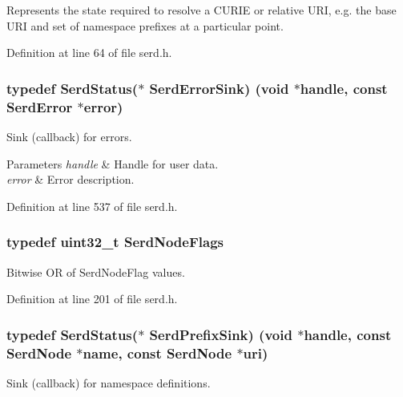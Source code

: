 Represents the state required to resolve a C\+U\+R\+IE or relative U\+RI, e.\+g. the base U\+RI and set of namespace prefixes at a particular point. 

Definition at line 64 of file serd.\+h.

\subsubsection[{\texorpdfstring{Serd\+Error\+Sink}{SerdErrorSink}}]{\setlength{\rightskip}{0pt plus 5cm}typedef {\bf Serd\+Status}($\ast$ Serd\+Error\+Sink) ({\bf void} $\ast$handle, {\bf const} {\bf Serd\+Error} $\ast${\bf error})}\hypertarget{group__serd_ga925d2fda236697a3e643b307ffe242e5}{}\label{group__serd_ga925d2fda236697a3e643b307ffe242e5}
Sink (callback) for errors.


\begin{DoxyParams}{Parameters}
{\em handle} & Handle for user data. \\
\hline
{\em error} & Error description. \\
\hline
\end{DoxyParams}


Definition at line 537 of file serd.\+h.

\subsubsection[{\texorpdfstring{Serd\+Node\+Flags}{SerdNodeFlags}}]{\setlength{\rightskip}{0pt plus 5cm}typedef {\bf uint32\+\_\+t} {\bf Serd\+Node\+Flags}}\hypertarget{group__serd_gafa75ae761bd7490db787b2f9e237595a}{}\label{group__serd_gafa75ae761bd7490db787b2f9e237595a}
Bitwise OR of Serd\+Node\+Flag values. 

Definition at line 201 of file serd.\+h.

\subsubsection[{\texorpdfstring{Serd\+Prefix\+Sink}{SerdPrefixSink}}]{\setlength{\rightskip}{0pt plus 5cm}typedef {\bf Serd\+Status}($\ast$ Serd\+Prefix\+Sink) ({\bf void} $\ast$handle, {\bf const} {\bf Serd\+Node} $\ast${\bf name}, {\bf const} {\bf Serd\+Node} $\ast${\bf uri})}\hypertarget{group__serd_ga692f0bbdf5e2576191ee3556ecde7d55}{}\label{group__serd_ga692f0bbdf5e2576191ee3556ecde7d55}
Sink (callback) for namespace definitions.

